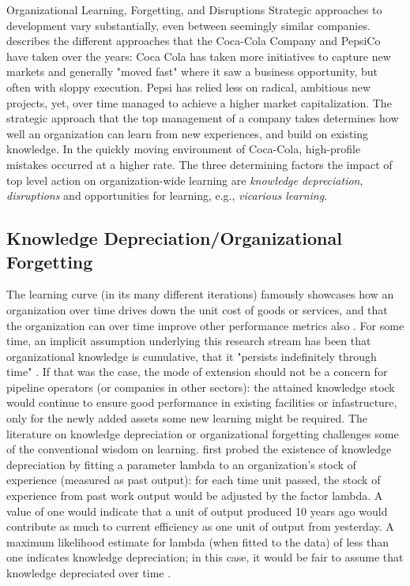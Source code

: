 {Organizational Learning, Forgetting, and Disruptions}
Strategic approaches to development vary substantially, even between seemingly similar companies. \citet{Morales-Raya2015} describes the different approaches that the Coca-Cola Company and PepsiCo have taken over the years: Coca Cola has taken more initiatives to capture new markets and generally "moved fast" where it saw a business opportunity, but often with sloppy execution. Pepsi has relied less on radical, ambitious new projects, yet, over time managed to achieve a higher market capitalization. The strategic approach that the top management of a company takes determines how well an organization can learn from new experiences, and build on existing knowledge. In the quickly moving environment of Coca-Cola, high-profile mistakes occurred at a higher rate. The three determining factors the impact of top level action on organization-wide learning are \textit{knowledge depreciation}, \textit{disruptions} and opportunities for learning, e.g., \textit{vicarious learning}.

\subsection{Knowledge Depreciation/Organizational Forgetting}

The learning curve (in its many different iterations) famously showcases how an organization over time drives down the unit cost of goods \citep{Wright1936} or services, and that the organization can over time improve other performance metrics also \citep[p. 1]{Argote2013_1}. For some time, an implicit assumption underlying this research stream has been that organizational knowledge is cumulative, that it "persists indefinitely through time" \citep[p. 57]{Argote2013_3}. If that was the case, the mode of extension should not be a concern for pipeline operators (or companies in other sectors): the attained knowledge stock would continue to ensure good performance in existing facilities or infastructure, only for the newly added assets some new learning might be required. The literature on knowledge depreciation or organizational forgetting challenges some of the conventional wisdom on learning. \citet{Argote2013_3} first probed the existence of knowledge depreciation by fitting a parameter lambda to an organization's stock of experience (measured as past output): for each time unit passed, the stock of experience from past work output would be adjusted by the factor lambda. A value of one would indicate that a unit of output produced 10 years ago would contribute as much to current efficiency as one unit of output from yesterday. A maximum likelihood estimate for lambda (when fitted to the data) of less than one indicates knowledge depreciation; in this case, it would be fair to assume that knowledge depreciated over time \citep[pp. 62ff.]{Argote2013_3}.

